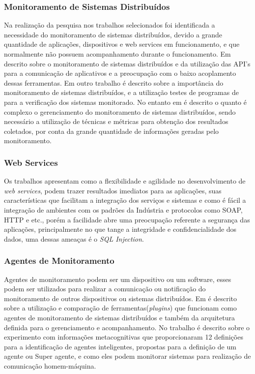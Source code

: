 \subsubsection{Monitoramento de Sistemas Distribuídos}
Na realização da pesquisa nos trabalhos selecionados foi identificada a necessidade do monitoramento de sistemas distribuídos, devido a grande quantidade de  aplicações, dispositivos e web services em funcionamento, e que normalmente não possuem acompanhamento durante o funcionamento. Em \cite{cirstoiu2007monitoring} descrito sobre o monitoramento de sistemas distribuídos e da utilização das API's para a comunicação de aplicativos e a preocupação com o baixo acoplamento dessas ferramentas. Em outro trabalho \cite{joyce1987monitoring} é descrito sobre a importância do monitoramento de sistemas distribuídos, e a utilização testes de programas de para a verificação dos sistemas monitorado. No entanto em \cite{abdu1996monitoring} é descrito o quanto é complexo o gerenciamento do monitoramento de sistemas distribuídos, sendo necessário a utilização de técnicas e métricas para obtenção dos resultados coletados, por conta da grande quantidade de informações geradas pelo monitoramento.  

\subsubsection{Web Services}

Os trabalhos \cite{patil2012remote,casola2009sensim} apresentam como a flexibilidade e agilidade no desenvolvimento de \textit{web services}, podem trazer resultados imediatos para as aplicações, suas características que facilitam a integração dos serviços e sistemas e como é fácil a integração de ambientes com os padrões da Indústria e protocolos como SOAP, HTTP e etc., porém a facilidade abre uma preocupação referente a segurança das aplicações, principalmente no que tange a integridade e confidencialidade dos dados, uma dessas ameaças é o \textit{SQL Injection}. 

\subsubsection{Agentes de Monitoramento}

Agentes de monitoramento podem ser um dispositivo ou um software, esses podem ser utilizados para realizar a comunicação ou notificação do monitoramento de outros dispositivos ou sistemas distribuídos. Em \cite{smith2008flexible} é descrito sobre a utilização e comparação de ferramentas(\textit{plugins}) que funcionam como agentes de monitoramento de sistemas distribuídos e também da arquitetura definida para o gerenciamento e acompanhamento. No trabalho \cite{puatruct2010agent} é descrito sobre o experimento com informações metacognitivas que proporcionaram 12 definições para a identificação de agentes inteligentes, propostas para a definição de um agente ou Super agente, e como eles podem monitorar sistemas para realização de comunicação homem-máquina.

